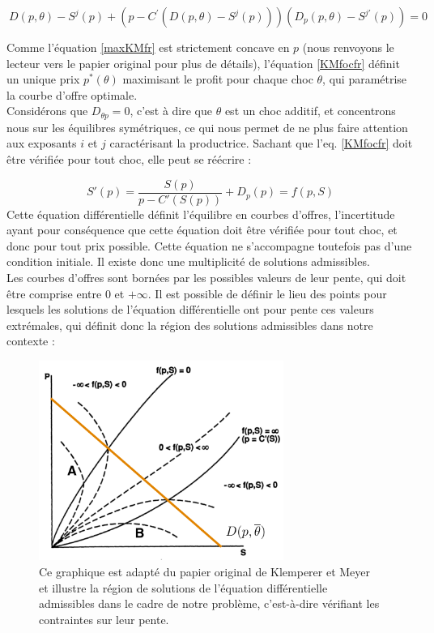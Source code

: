 \begin{equation}\label{KMfocfr}
\ D(p,\theta) - S^j(p) + \left( p - C^\prime\left( D(p,\theta) - S^j(p)\right)    \right)\left(  D_p(p,\theta)   - S^{j\prime}(p)\right) = 0
\end{equation}

Comme l'équation \ref{maxKMfr} est strictement concave en $p$ (nous renvoyons le lecteur vers le papier original pour plus de détails), l'équation \ref{KMfocfr} définit un unique prix $p^*(\theta)$ maximisant le profit pour chaque choc $\theta$, qui paramétrise la courbe d'offre optimale. \\

Considérons que $D_{\theta p }=0$, c'est à dire que $\theta$ est un choc additif, et concentrons nous sur les équilibres symétriques, ce qui nous permet de ne plus faire attention aux exposants $i$ et $j$ caractérisant la productrice. Sachant que l'eq. \ref{KMfocfr} doit être vérifiée pour tout choc, elle peut se réécrire :

\begin{equation}\label{KMdifffr}
S'(p) = \frac{S(p)}{p-C'(S(p))} + D_p(p)= f(p,S)
\end{equation}
Cette équation différentielle définit l'équilibre en courbes d'offres, l'incertitude ayant pour conséquence que cette équation doit être vérifiée pour tout choc, et donc pour tout prix possible. Cette équation ne s'accompagne toutefois pas d'une condition initiale. Il existe donc une multiplicité de solutions admissibles.\\

Les courbes d'offres sont bornées par les possibles valeurs de leur pente, qui doit être comprise entre $0$ et $+\infty$. Il est possible de définir le lieu des points pour lesquels les solutions de l'équation différentielle ont pour pente ces valeurs extrémales, qui définit donc la région des solutions admissibles dans notre contexte : 

\begin{figure}[h]
\centering
\includegraphics[width=8cm]{figintro/KMboundaries.png}
\caption{\small{Ce graphique est adapté du papier original de Klemperer et Meyer et illustre la région de solutions de l'équation différentielle admissibles dans le cadre de notre problème, c'est-à-dire vérifiant les contraintes sur leur pente.}}
\label{KMboundariesfr}
\end{figure}

